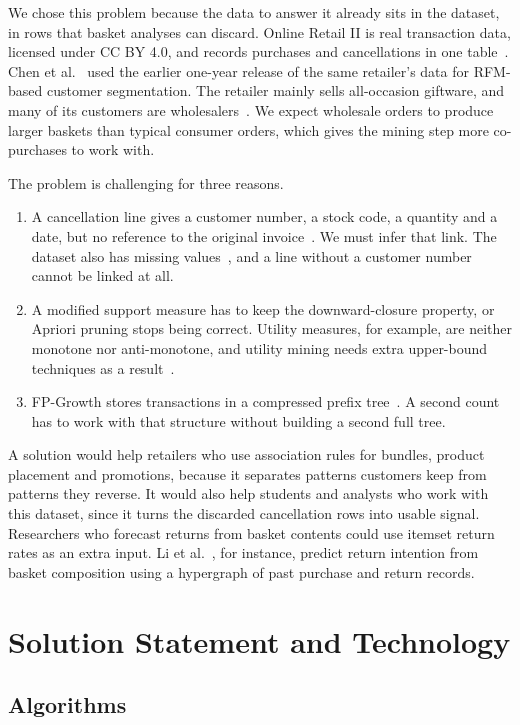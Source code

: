 \documentclass[11pt,a4paper]{article}
\begin{document}
We chose this problem because the data to answer it already sits in the dataset, in rows that basket analyses can discard. Online Retail II is real transaction data, licensed under CC BY 4.0, and records purchases and cancellations in one table~\cite{uci_oretail2}. Chen et al.~\cite{chen2012} used the earlier one-year release of the same retailer's data for RFM-based customer segmentation. The retailer mainly sells all-occasion giftware, and many of its customers are wholesalers~\cite{uci_oretail2}. We expect wholesale orders to produce larger baskets than typical consumer orders, which gives the mining step more co-purchases to work with.

The problem is challenging for three reasons.
\begin{enumerate}
  \item A cancellation line gives a customer number, a stock code, a quantity and a date, but no reference to the original invoice~\cite{uci_oretail2}. We must infer that link. The dataset also has missing values~\cite{uci_oretail2}, and a line without a customer number cannot be linked at all.
  \item A modified support measure has to keep the downward-closure property, or Apriori pruning stops being correct. Utility measures, for example, are neither monotone nor anti-monotone, and utility mining needs extra upper-bound techniques as a result~\cite{gan2021}.
  \item FP-Growth stores transactions in a compressed prefix tree~\cite{han2000}. A second count has to work with that structure without building a second full tree.
\end{enumerate}

A solution would help retailers who use association rules for bundles, product placement and promotions, because it separates patterns customers keep from patterns they reverse. It would also help students and analysts who work with this dataset, since it turns the discarded cancellation rows into usable signal. Researchers who forecast returns from basket contents could use itemset return rates as an extra input. Li et al.~\cite{li2018}, for instance, predict return intention from basket composition using a hypergraph of past purchase and return records.

\section*{Solution Statement and Technology}

\subsection*{Algorithms}
\end{document}
